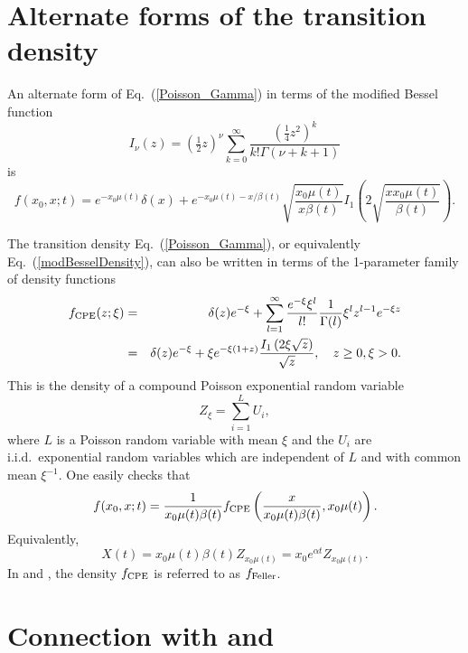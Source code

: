\documentclass[preprint,12pt]{elsarticle}
\begin{document}
\section{Alternate forms of the transition density}\label{sec:Alternate_f}

An alternate form of Eq.~(\ref{Poisson_Gamma}) in terms of the modified Bessel function 
\[
I_\nu(z) = \left(\tfrac{1}{2}z\right)^\nu \sum_{k = 0}^\infty \frac{\left(\tfrac{1}{4}z^2\right)^k}{k! \Gamma(\nu + k + 1)} 
\]
is~\citetext{\citealp[Eq.~5.2]{feller1951diffusion}; \citealp[Eq.~6.2]{feller1951two}}
\begin{equation}	\label{modBesselDensity}
f(x_0, x; t) = e^{-x_0 \mu(t)} \delta(x) + e^{-x_0 \mu(t) - x/\beta(t)} \sqrt{\frac{x_0\mu(t)}{x\beta(t)}} I_1 \left( 2\sqrt{\frac{xx_0\mu(t)}{\beta(t)}}\right). 
\end{equation}

The transition density Eq.~(\ref{Poisson_Gamma}), or equivalently Eq.~(\ref{modBesselDensity}), can also be written in terms of 
the 1-parameter family of density functions 
\begin{eqnarray*}	%
f_{\rm CPE}(z; \xi) & = & \delta(z) e^{-\xi} + \sum_{l = 1}^\infty \frac{e^{-\xi} \xi^l}{l!} \frac{1}{\Gamma(l)} \xi^l z^{l -1} e^{-\xi z}		\nonumber \\
	& = & \delta(z) e^{-\xi} + \xi e^{-\xi(1 + z)} \frac{I_1\left(2 \xi \sqrt z \right)}{\sqrt z}, \quad z \ge 0, \xi > 0.  
\end{eqnarray*}
This is the density of a compound Poisson exponential random variable 
\[
Z_\xi = \sum_{i = 1}^L U_i, 
\]
where $L$ is a Poisson random variable with mean $\xi$ and the $U_i$ are i.i.d.\ exponential random variables which are independent of $L$ and 
with common mean $\xi^{-1}$.  One easily checks that 
\begin{equation*}	\label{fInTermsOfCPE}
f(x_0, x; t) = \frac{1}{x_0 \mu(t) \beta(t)} f_{\rm CPE}\left(\frac{x}{x_0 \mu(t) \beta(t)}, x_0 \mu(t) \right).
\end{equation*}
Equivalently, 
\[
X(t) = x_0 \mu(t)\beta(t) Z_{x_0\mu(t)} = x_0 e^{\alpha t} Z_{x_0\mu(t)}.  
\]
In \citet[Eq.~(32) with a typographical error]{burden2018mutation} and \citet[Eq.~(24)]{BurdenSoewongsoso19}, the density $f_{\rm CPE}$ is referred to as $f_{\rm Feller}$.  

%
%

\section{Connection with \citet{o1995genealogy} and \citet{Harris20}}
\label{sec:connectionOC_HJR}
\end{document}
